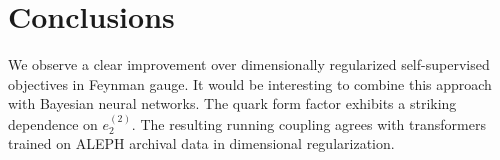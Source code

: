 \section{Conclusions}\label{sec:conclusions}

We observe a clear improvement over dimensionally regularized
self-supervised objectives in Feynman gauge. It would be interesting to
combine this approach with Bayesian neural networks. The quark form
factor exhibits a striking dependence on $e_2^{(2)}$. The resulting
running coupling agrees with transformers trained on ALEPH archival data
in dimensional regularization.

